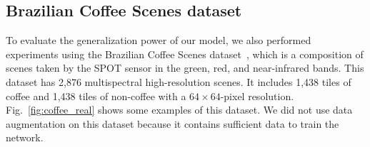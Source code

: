 \documentclass[journal]{IEEEtran}
\begin{document}
%	
%		




\subsection{Brazilian Coffee Scenes dataset}
\label{subsect:coffee}
To evaluate the generalization power of our model, we also performed experiments using the Brazilian Coffee Scenes dataset~\cite{penatti2015deep}, which is a composition of scenes taken by the SPOT sensor in the green, red, and near-infrared bands. This dataset has 2,876 multispectral high-resolution scenes. It includes 1,438 tiles of coffee and 1,438 tiles of non-coffee with a $64\times64$-pixel resolution. Fig.~\ref{fig:coffee_real} shows some examples of this dataset. We did not use data augmentation on this dataset because it contains sufficient data to train the network.

%
%
\end{document}
